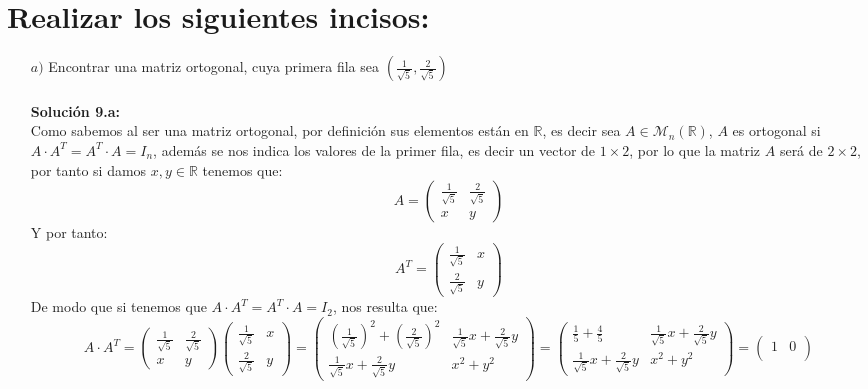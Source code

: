 \section{Realizar los siguientes incisos:}
\begin{itemize}
    \item [$a)$] Encontrar una matriz ortogonal, cuya primera fila sea $\displaystyle  \left(\frac{1}{\sqrt{5}},\frac{2}{\sqrt{5}}\right)$\\\\
    \textbf{Soluci\'on 9.a:}\\
    Como sabemos al ser una matriz ortogonal, por definici\'on sus elementos est\'an en $\mathbb{R}$, es decir sea $A\in\mathcal{M}_n(\mathbb{R})$, $A$ es ortogonal si $A\cdot A^{T}=A^{T}\cdot A=I_n$, adem\'as se nos indica los valores de la primer fila, es decir un vector de $1\times 2$, por lo que la matriz $A$ ser\'a de $2\times 2$, por tanto si damos $x,y\in\mathbb{R}$ tenemos que:
    \[A=\begin{pmatrix}
    \frac{1}{\sqrt{5}} & \frac{2}{\sqrt{5}}\\
    x & y\end{pmatrix}\]Y por tanto:
    \[A^{T}=\begin{pmatrix}
    \frac{1}{\sqrt{5}} & x\\
    \frac{2}{\sqrt{5}} & y\end{pmatrix}\]
    De modo que si tenemos que $A\cdot A^{T}=A^{T}\cdot A=I_2$, nos resulta que:
    \[A\cdot A^{T}=\begin{pmatrix}
    \frac{1}{\sqrt{5}} & \frac{2}{\sqrt{5}}\\
    x & y\end{pmatrix}\begin{pmatrix}
    \frac{1}{\sqrt{5}} & x\\
    \frac{2}{\sqrt{5}} & y\end{pmatrix}=\begin{pmatrix}
    \left(\frac{1}{\sqrt{5}}\right)^2+\left(\frac{2}{\sqrt{5}}\right)^2 & \frac{1}{\sqrt{5}}x+\frac{2}{\sqrt{5}}y\\
    \frac{1}{\sqrt{5}}x+\frac{2}{\sqrt{5}}y & x^2+y^2\end{pmatrix}=\begin{pmatrix}
    \frac{1}{5}+\frac{4}{5} & \frac{1}{\sqrt{5}}x+\frac{2}{\sqrt{5}}y\\
    \frac{1}{\sqrt{5}}x+\frac{2}{\sqrt{5}}y & x^2+y^2\end{pmatrix}=\begin{pmatrix}
    1 & 0\\

\end{pmatrix}\]
\end{itemize}

